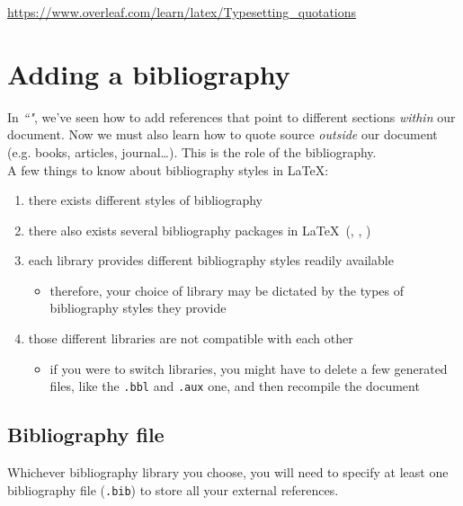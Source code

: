 \hfill
\url{https://www.overleaf.com/learn/latex/Typesetting_quotations}





\section{Adding a bibliography} \label{add-biblio}

In \emph{``"}, we've seen how to add references that point to different sections \emph{within} our document. Now we must also learn how to quote source \emph{outside} our document (e.g. books, articles, journal\ldots). This is the role of the bibliography. \\

A few things to know about bibliography styles in \LaTeX:
\begin{enumerate}
	\item there exists different styles of bibliography
	\item there also exists several bibliography packages in \LaTeX\ (, , )
	\item each library provides different bibliography styles readily available
	\begin{itemize}
		\item therefore, your choice of library may be dictated by the types of bibliography styles they provide
	\end{itemize}
	\item those different libraries are not compatible with each other
	\begin{itemize}
		\item if you were to switch libraries, you might have to delete a few generated files, like the \texttt{.bbl} and \texttt{.aux} one, and then recompile the document
	\end{itemize}
\end{enumerate}

\bigskip



\subsection{Bibliography file} \label{bibliography-file}

Whichever bibliography library you choose, you will need to specify at least one bibliography file (\texttt{.bib}) to store all your external references. \\

